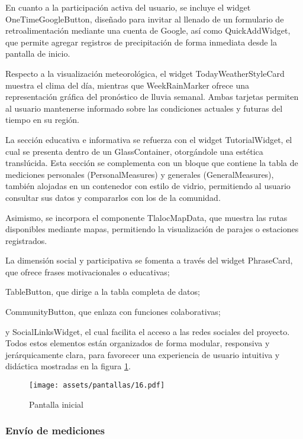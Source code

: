 En cuanto a la participación activa del usuario, se incluye el widget OneTimeGoogleButton, diseñado para invitar al llenado de un formulario de retroalimentación mediante una cuenta de Google, así como QuickAddWidget, que permite agregar registros de precipitación de forma inmediata desde la pantalla de inicio.

Respecto a la visualización meteorológica, el widget TodayWeatherStyleCard muestra el clima del día, mientras que WeekRainMarker ofrece una representación gráfica del pronóstico de lluvia semanal. Ambas tarjetas permiten al usuario mantenerse informado sobre las condiciones actuales y futuras del tiempo en su región.

La sección educativa e informativa se refuerza con el widget TutorialWidget, el cual se presenta dentro de un GlassContainer, otorgándole una estética translúcida. Esta sección se complementa con un bloque que contiene la tabla de mediciones personales (PersonalMeasures) y generales (GeneralMeasures), también alojadas en un contenedor con estilo de vidrio, permitiendo al usuario consultar sus datos y compararlos con los de la comunidad.

Asimismo, se incorpora el componente TlalocMapData, que muestra las rutas disponibles mediante mapas, permitiendo la visualización de parajes o estaciones registrados. 

La dimensión social y participativa se fomenta a través del widget PhraseCard, que ofrece frases motivacionales o educativas;

TableButton, que dirige a la tabla completa de datos; 

CommunityButton, que enlaza con funciones colaborativas; 

y SocialLinksWidget, el cual facilita el acceso a las redes sociales del proyecto. Todos estos elementos están organizados de forma modular, responsiva y jerárquicamente clara, para favorecer una experiencia de usuario intuitiva y didáctica mostradas en la figura \ref{pantallas16}.
\begin{figure}[h!]
\centering
  \texttt{[image: assets/pantallas/16.pdf]}
  \caption{Pantalla inicial}
  \label{pantallas16}
\end{figure}














\newpage
\subsubsection{Envío de mediciones}


